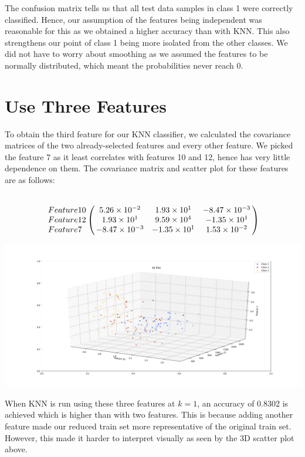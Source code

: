 \documentclass[11pt]{article}
\begin{document}
The confusion matrix tells us that all test data samples in class 1 were correctly classified. Hence, our assumption of the features being independent was reasonable for this as we obtained a higher accuracy than with KNN. This also strengthens our point of class 1 being more isolated from the other classes. We did not have to worry about smoothing as we assumed the features to be normally distributed, which meant the probabilities never reach 0.

\section{Use Three Features}
To obtain the third feature for our KNN classifier, we calculated the covariance matrices of the two already-selected features and every other feature. We picked the feature 7 as it least correlates with features 10 and 12, hence has very little dependence on them. The covariance matrix and scatter plot for these features are as follows:

$$
\bordermatrix{ ~ & ~ & ~ & ~ \cr
Feature 10 & 5.26\times10^{-2} & 1.93\times10^1 & -8.47\times10^{-3} \cr
Feature 12 & 1.93\times10^1 & 9.59\times10^4 & -1.35\times10^1 \cr
Feature 7 & -8.47\times10^{-3} & -1.35\times10^1 & 1.53\times10^{-2} \cr}
$$

\begin{center}
\includegraphics[scale=0.3]{3d_plot}
\end{center}

When KNN is run using these three features at $k = 1$, an accuracy of 0.8302 is achieved which is higher than with two features. This is because adding another feature made our reduced train set more representative of the original train set. However, this made it harder to interpret visually as seen by the 3D scatter plot above.
\end{document}

